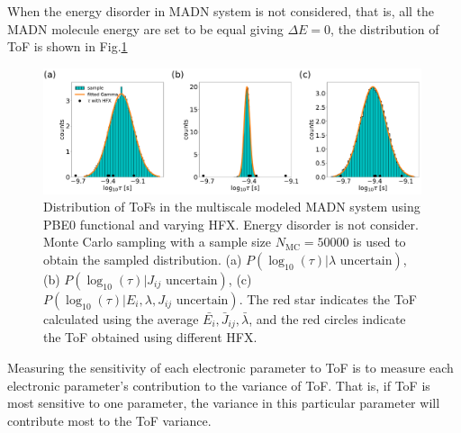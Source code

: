 \documentclass[letterpaper,12pt]{article}
\begin{document}
When the energy disorder in MADN system is not considered, that is, all the MADN molecule energy are set to be equal giving $\Delta E=0$, the distribution of ToF is shown in Fig.\ref{fig:mle_MADN_noE}
%
\begin{figure}[H]
    \centering
    \includegraphics[width=0.99\textwidth]{figs/MADN_HFX/fig_mle_MADN_noE.pdf}
    \caption{Distribution of ToFs in the multiscale modeled MADN system using PBE0 functional and varying HFX. Energy disorder is not consider. Monte Carlo sampling with a sample size $N_\text{MC}=50000$ is used to obtain the sampled distribution.
    (a) $P(\log_{10}(\tau)|\lambda \text{ uncertain})$, 
    (b) $P(\log_{10}(\tau)|J_{ij} \text{ uncertain})$, 
    (c) $P(\log_{10}(\tau)|E_i, \lambda, J_{ij} \text{ uncertain})$. The red star indicates the ToF calculated using the average $\bar{E_i}, \bar{J}_{ij}, \bar{\lambda}$, and the red circles indicate the ToF obtained using different HFX.}
    \label{fig:mle_MADN_noE}
\end{figure}
%


Measuring the sensitivity of each electronic parameter to ToF is to measure each electronic parameter's contribution to the variance of ToF. 
That is, if ToF is most sensitive to one parameter, the variance in this particular parameter will contribute most to the ToF variance. 
\end{document}
